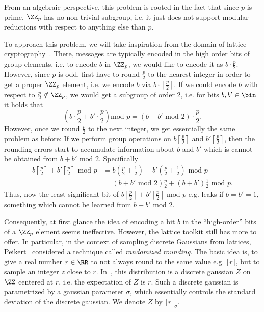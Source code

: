 From an algebraic perspective, this problem is rooted in the fact that since $p$ is prime, $\ZZ_p$ has no non-trivial subgroup, i.e. it just does not support modular reductions with respect to anything else than $p$.

To approach this problem, we will take inspiration from the domain of lattice cryptography~\cite{STOC:Regev05}. There, messages are typically encoded in the high order bits of group elements, i.e. to encode $b$ in $\ZZ_p$, we would like to encode it as $b \cdot \frac{p}{2}$. However, since $p$ is odd, first have to round $\frac{p}{2}$ to the nearest integer in order to get a proper $\ZZ_p$ element, i.e. we encode $b$ via $b \cdot \left\lceil \frac{p}{2} \right\rceil$. If we could encode $b$ with respect to $\frac{p}{2} \notin \ZZ_p$, we would get a subgroup of order 2, i.e. for bits $b,b' \in \bin$ it holds that
\[
\left( b \cdot \frac{p}{2} + b'\cdot \frac{p}{2} \right) \text{mod } p = (b + b' \text{ mod } 2)\cdot \frac{p}{2}.
\]
However, once we round $\frac{p}{2}$ to the next integer, we get essentially the same problem as before: If we perform group operations on $b \left\lceil \frac{p}{2} \right\rceil$ and $b' \left\lceil \frac{p}{2} \right\rceil$, then the rounding errors start to accumulate information about $b$ and $b'$ which is cannot be obtained from $b + b' \text{ mod } 2$. Specifically
\begin{align*}
b \left\lceil \frac{p}{2}\right \rceil + b' \left\lceil \frac{p}{2} \right\rceil \text{ mod } p &= b \left(\frac{p}{2} + \frac{1}{2}\right) + b' \left( \frac{p}{2} + \frac{1}{2} \right) \text{ mod } p\\
&= (b + b' \text{ mod } 2)\frac{p}{2} + (b + b') \frac{1}{2} \text{ mod } p.
\end{align*}
Thus, now the least significant bit of $b\left \lceil \frac{p}{2} \right\rceil + b' \left\lceil \frac{p}{2} \right\rceil \text{ mod } p$ e.g. leaks if $b = b' = 1$, something which cannot be learned from $b + b' \text{ mod } 2$.

Consequently, at first glance the idea of encoding a bit $b$ in the ``high-order'' bits of a $\ZZ_p$ element seems ineffective. However, the lattice toolkit still has more to offer. In particular, in the context of sampling discrete Gaussians from lattices, Peikert~\cite{C:Peikert10} considered a technique called \emph{randomized rounding}. The basic idea is, to give a real number $r \in \RR$ to not always round to the same value e.g. $\lceil r \rceil$, but to sample an integer $z$ close to $r$. In~\cite{C:Peikert10}, this distribution is a discrete gaussian $Z$ on $\ZZ$ centered at $r$, i.e. the expectation of $Z$ is $r$. Such a discrete gaussian is parametrized by a gaussian parameter $\sigma$, which essentially controls the standard deviation of the discrete gaussian. We denote $Z$ by $\lceil r \rfloor_\sigma$.

